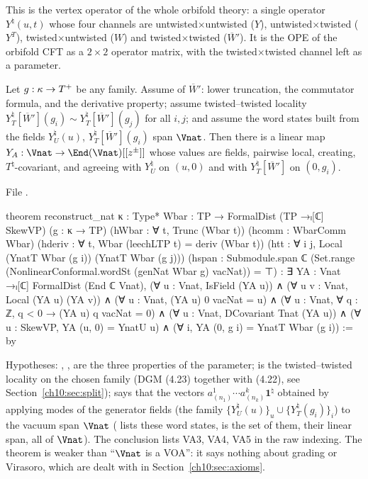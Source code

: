 \begin{physics}
This is the vertex operator of the whole orbifold theory: a single operator $Y^\natural(u,t)$ whose four channels are untwisted$\times$untwisted ($Y$), untwisted$\times$twisted ($Y^T$), twisted$\times$untwisted ($W$) and twisted$\times$twisted ($\overline W'$). It is the OPE of the orbifold CFT as a $2\times2$ operator matrix, with the twisted$\times$twisted channel left as a parameter.
\end{physics}

\begin{theorem}\label{ch10:thm:reconstructnat}
Let $g:\kappa\to T^{+}$ be any family.  Assume of $\overline W'$: lower truncation, the
commutator formula, and the derivative property; assume twisted--twisted locality
$Y^\natural_T[\overline W'](g_i)\sim Y^\natural_T[\overline W'](g_j)$ for all $i,j$; and assume the
word states built from the fields $Y^\natural_U(u)$, $Y^\natural_T[\overline W'](g_i)$ span
$\Vnat$.  Then there is a linear map $Y_A:\Vnat\to\End(\Vnat)[[z^\pm]]$ whose values are fields,
pairwise local, creating, $T^\natural$-covariant, and agreeing with $Y^\natural_U$ on $(u,0)$ and
with $Y^\natural_T[\overline W']$ on $(0,g_i)$.
\end{theorem}
\noindent File .
\begin{leancode}
theorem reconstruct_nat {κ : Type*} {Wbar : TP → FormalDist (TP →ₗ[ℂ] SkewVP)} (g : κ → TP)
    (hWbar : ∀ t, Trunc (Wbar t)) (hcomm : WbarComm Wbar)
    (hderiv : ∀ t, Wbar (leechLTP t) = deriv (Wbar t))
    (htt : ∀ i j, Local (YnatT Wbar (g i)) (YnatT Wbar (g j)))
    (hspan : Submodule.span ℂ (Set.range (NonlinearConformal.wordSt (genNat Wbar g) vacNat))
      = ⊤) :
    ∃ YA : Vnat →ₗ[ℂ] FormalDist (End ℂ Vnat),
      (∀ u : Vnat, IsField (YA u)) ∧
      (∀ u v : Vnat, Local (YA u) (YA v)) ∧
      (∀ u : Vnat, (YA u) 0 vacNat = u) ∧
      (∀ u : Vnat, ∀ q : ℤ, q < 0 → (YA u) q vacNat = 0) ∧
      (∀ u : Vnat, DCovariant Tnat (YA u)) ∧
      (∀ u : SkewVP, YA (u, 0) = YnatU u) ∧
      (∀ i, YA (0, g i) = YnatT Wbar (g i)) := by
\end{leancode}
\begin{dictionary}
Hypotheses: , ,  are the three properties of the parameter;
 is the twisted--twisted locality on the chosen family (DGM (4.23) together with
(4.22), see Section~\ref{ch10:sec:split});  says that the vectors
$a^1_{(n_1)}\cdots a^k_{(n_k)}\mathbf1^\natural$ obtained by applying modes of the generator fields
 (the family $\{Y^\natural_U(u)\}_u\cup\{Y^\natural_T(g_i)\}_i$) to the vacuum
span $\Vnat$ ( lists these word states,  is the set of them,
 their linear span,  all of $\Vnat$).  The conclusion lists VA3,
VA4, VA5 in the raw indexing.  The theorem is weaker than ``$\Vnat$ is a VOA'': it says nothing
about grading or Virasoro, which are dealt with in Section~\ref{ch10:sec:axioms}.
\end{dictionary}

